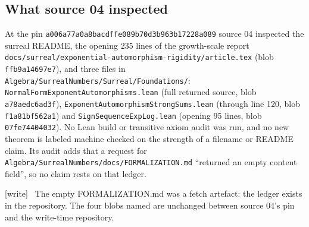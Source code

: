 \documentclass[11pt,a4paper]{article}
\numberwithin{equation}{section}
\theoremstyle{plain}
\theoremstyle{definition}
\theoremstyle{remark}
\newcommand{\code}[1]{\texttt{\small #1}}
\newcommand{\fn}[1]{\nolinkurl{#1}}%
\newcommand{\wtag}{\textup{\textsf{[write]}}}%
\newenvironment{wnote}{\par\smallskip\noindent\wtag\ }{\par\smallskip}
\begin{document}
\subsection{What source 04 inspected}
At the pin \code{a006a77a0a8bacdffe089b70d3b963b17228a089} source 04 inspected
the surreal README, the opening 235 lines of the growth-scale report
\fn{docs/surreal/exponential-automorphism-rigidity/article.tex} (blob
\code{ffb9a14697e7}), and three files in
\fn{Algebra/SurrealNumbers/Surreal/Foundations/}:
\fn{NormalFormExponentAutomorphisms.lean} (full returned source, blob
\code{a78aedc6ad3f}), \fn{ExponentAutomorphismStrongSums.lean} (through line
120, blob \code{f1a81bf562a1}) and \fn{SignSequenceExpLog.lean} (opening 95
lines, blob \code{07fe74404032}). No Lean build or transitive axiom audit was
run, and no new theorem is labeled machine checked on the strength of a
filename or README claim. Its audit adds that a request for
\fn{Algebra/SurrealNumbers/docs/FORMALIZATION.md} ``returned an empty content
field'', so no claim rests on that ledger.
\begin{wnote}
The empty FORMALIZATION.md was a fetch artefact: the ledger exists in the
repository. The four blobs named are unchanged between source 04's pin and
the write-time repository.
\end{wnote}
\end{document}
